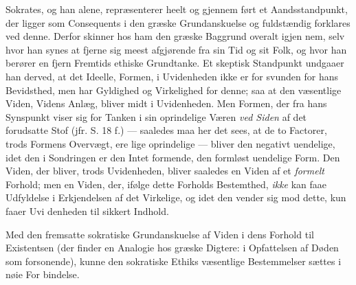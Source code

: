 \documentclass[12pt,a4paper]{book}
\begin{document}
Sokrates, og han alene, repræsenterer heelt og gjennem\-%
ført et Aandsstandpunkt, der ligger som Consequents i den
græske Grundanskuelse og fuldstændig forklares ved denne.
Derfor skinner hos ham den græske Baggrund overalt igjen\-%
nem, selv hvor han synes at fjerne sig meest afgjørende fra
sin Tid og sit Folk, og hvor han berører en fjern Fremtids
ethiske Grundtanke. Et skeptisk Standpunkt undgaaer han
derved, at det Ideelle, Formen, i Uvidenheden ikke er for\-%
svunden for hans Bevidsthed, men har Gyldighed og Virkelighed
for denne; saa at den væsentlige Viden, Videns Anlæg, bliver
midt i Uvidenheden. Men Formen, der fra hans Synspunkt
viser sig for Tanken i sin oprindelige Væren \emph{ved Siden} af det
forudsatte Stof (jfr. S. 18 f.) --- saaledes maa her det sees, at
de to Factorer, trods Formens Overvægt, ere lige oprindelige ---
bliver den negativt uendelige, idet den i Sondringen er den
Intet formende, den formløst uendelige Form. Den Viden,
der bliver, trods Uvidenheden, bliver saaledes en Viden af et
\emph{formelt} Forhold; men en Viden, der, ifølge dette Forholds
Bestemthed, \emph{ikke} kan faae Udfyldelse i Erkjendelsen af det
Virkelige, og idet den vender sig mod dette, kun faaer Uvi\-%
denheden til sikkert Indhold.

Med den fremsatte sokratiske Grundanskuelse af Viden i
dens Forhold til Existentsen (der finder en Analogie hos græske
Digtere: i Opfattelsen af Døden som forsonende), kunne den
sokratiske Ethiks væsentlige Bestemmelser sættes i nøie For\-%
bindelse.
\end{document}
